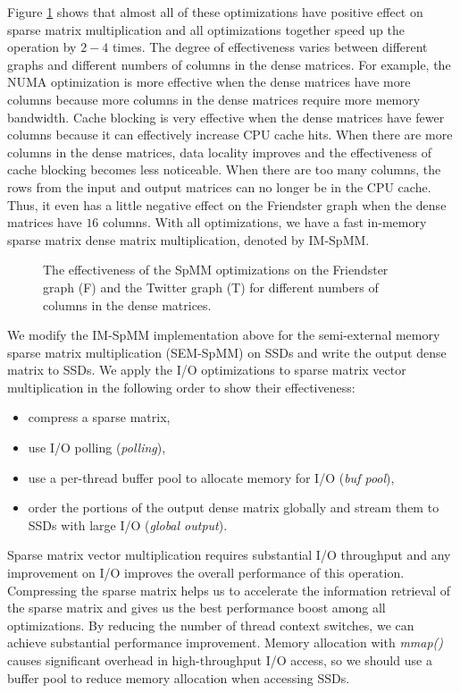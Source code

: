 Figure \ref{perf:spmm_opt} shows that almost all of these optimizations have
positive effect on sparse matrix multiplication and all optimizations
together speed up the operation by $2-4$ times. The degree of effectiveness
varies between different graphs and different numbers of columns in
the dense matrices. For example, the NUMA optimization is more effective when
the dense matrices have more columns because more columns in the dense matrices
require more memory bandwidth. Cache blocking is very effective when
the dense matrices have fewer columns because it can effectively increase CPU
cache hits. When there are more columns in the dense matrices, data locality
improves and the effectiveness of cache blocking becomes less noticeable.
When there are too many columns, the rows from
the input and output matrices can no longer be in the CPU cache. Thus, it even
has a little negative effect on the Friendster graph when the dense matrices
have $16$ columns. With all optimizations, we have a fast in-memory sparse
matrix dense matrix multiplication, denoted by IM-SpMM.

\begin{figure}
	\begin{center}
		\footnotesize
		
		\caption{The effectiveness of the SpMM optimizations on the Friendster
			graph (F) and the Twitter graph (T) for different numbers of
			columns in the dense matrices.}
		\label{perf:spmm_opt}
	\end{center}
\end{figure}

We modify the IM-SpMM implementation above for the semi-external memory sparse
matrix multiplication (SEM-SpMM) on SSDs and write the output dense matrix to
SSDs. We apply the I/O optimizations to sparse matrix vector multiplication
in the following order to show their effectiveness: 
\begin{itemize} \itemsep1pt \parskip0pt 
	\item compress a sparse matrix,
	\item use I/O polling (\textit{polling}),
	\item use a per-thread buffer pool to allocate memory for I/O
		(\textit{buf pool}),
	\item order the portions of the output dense matrix globally and stream them
		to SSDs with large I/O (\textit{global output}).
\end{itemize}

Sparse matrix vector multiplication requires substantial I/O throughput and
any improvement on I/O improves the overall performance of this operation.
Compressing the sparse matrix helps us to accelerate the information retrieval
of the sparse matrix and gives us the best performance boost among all
optimizations. By reducing the number of thread context switches, we can
achieve substantial performance improvement. Memory allocation with
\textit{mmap()} causes significant overhead in high-throughput I/O access,
so we should use a buffer pool to reduce memory allocation when accessing SSDs.

